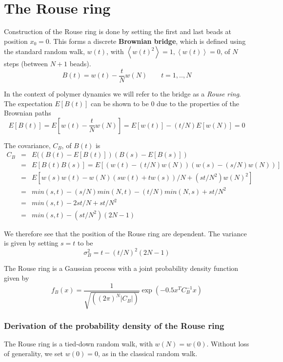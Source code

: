 \documentclass{report}
\begin{document}
\section{The Rouse ring}\label{section_theRouseRing}
Construction of the Rouse ring is done by setting the first and last beads at position $x_0=0$. This forms a discrete \textbf{Brownian bridge}, which is defined using the standard random walk, $w(t)$, with $\left<w(t)^2\right>=1, \left<w(t)\right>=0$, of $N$ steps (between $N+1$ beads). 
\begin{equation*}
B(t)= w(t)-\frac{t}{N}w(N) \qquad t=1,..,N
\end{equation*} 

In the context of polymer dynamics we will refer to the bridge as a \textit{Rouse ring}. The expectation $E[B(t)]$ can be shown to be 0 due to the properties of the Brownian paths
\begin{equation*}
E[B(t)]=E[w(t)-\frac{t}{N}w(N)]=E[w(t)] -(t/N)E[w(N)]=0
\end{equation*}

The covariance, $C_B$, of $B(t)$ is 
\begin{eqnarray*}
C_{B}  & = & E((B(t)-E[B(t)])(B(s)-E[B(s)])\\
   & = & E[B(t)B(s)]=E[(w(t)-(t/N)w(N))(w(s)-(s/N)w(N))]\\
   & = & E[w(s)w(t)-w(N)(sw(t)+tw(s))/N +(st/N^2)w(N)^2 ]\\
   & = & min(s,t)-(s/N)min(N,t)-(t/N)min(N,s)+st/N^2\\
   & = & min(s,t)-2st/N+st/N^2\\
   & = & min(s,t)-(st/N^2)(2N-1)
\end{eqnarray*}

We therefore see that the position of the Rouse ring are dependent. The variance is given by setting $s=t$ to be 
\begin{equation*}  
\sigma^2_{B}=t-(t/N)^2(2N-1)
\end{equation*}

The Rouse ring is a Gaussian process with a joint probability density function  given by  
\begin{equation*}
f_B(x)=\frac{1}{\sqrt{((2\pi)^N|C_B|)}}\exp(-0.5x^TC_B^{-1}x)
\end{equation*}

\subsubsection{Derivation of the probability density of the Rouse ring}
The Rouse ring is a tied-down random walk, with $w(N)=w(0)$. Without loss of generality, we set $w(0)=0$, as in the classical random walk.
\end{document}
